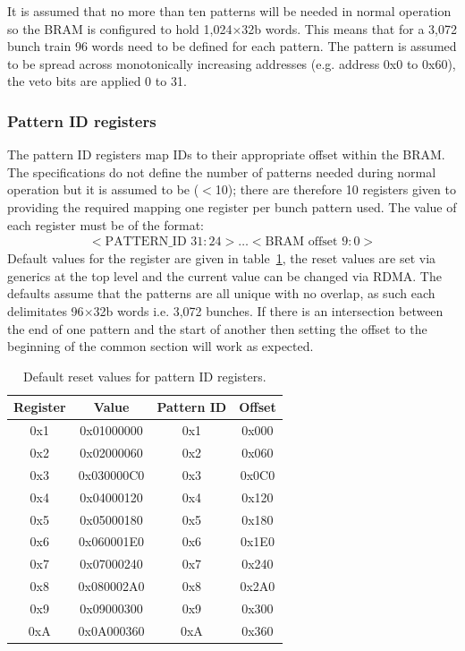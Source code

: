 It is assumed that no more than ten patterns will be needed in normal operation so the BRAM is configured to hold 1,024\( \times  \)32b words. This means that for a 3,072 bunch train 96 words need to be defined for each pattern. The pattern is assumed to be spread across monotonically increasing addresses (e.g. address 0x0 to 0x60), the veto bits are applied 0 to 31. 
\subsubsection{Pattern ID registers} %
\label{sub:pattern_id_registers}
The pattern ID registers map IDs to their appropriate offset within the BRAM. The specifications do not define the number of patterns needed during normal operation but it is assumed to be (\( < \)10); there are therefore 10 registers given to providing the required mapping one register per bunch pattern used. The value of each register must be of the format:
\begin{align} \label{fmt:pattern_id}
  <\text{PATTERN\_ID } 31:24>\ldots<\text{BRAM offset } 9:0> 
\end{align}
Default values for the register are given in table~\ref{tab:default_pattern_id_reg}, the reset values are set via generics at the top level and the current value can be changed via RDMA. The defaults assume that the patterns are all unique with no overlap, as such each delimitates 96\( \times \)32b words i.e. 3,072 bunches. If there is an intersection between the end of one pattern and the start of another then setting the offset to the beginning of the common section will work as expected.
\begin{table}[htbp]
  \begin{center}
    \begin{tabular}{c|c|c|c}
      Register & Value      & Pattern ID & Offset \\
      \hline
      0x1      & 0x01000000 & 0x1        & 0x000  \\ 
      0x2      & 0x02000060 & 0x2        & 0x060  \\  
      0x3      & 0x030000C0 & 0x3        & 0x0C0  \\ 
      0x4      & 0x04000120 & 0x4        & 0x120  \\ 
      0x5      & 0x05000180 & 0x5        & 0x180  \\ 
      0x6      & 0x060001E0 & 0x6        & 0x1E0  \\ 
      0x7      & 0x07000240 & 0x7        & 0x240  \\ 
      0x8      & 0x080002A0 & 0x8        & 0x2A0  \\ 
      0x9      & 0x09000300 & 0x9        & 0x300  \\ 
      0xA      & 0x0A000360 & 0xA        & 0x360  \\ 
    \end{tabular}
  \end{center}
  \caption{Default reset values for pattern ID registers.}
  \label{tab:default_pattern_id_reg}
\end{table}
